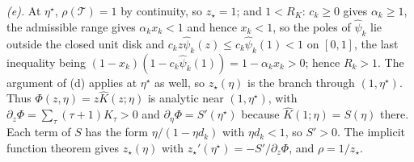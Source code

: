 \documentclass[11pt]{article}
\theoremstyle{remark}
\newcommand{\T}{\mathcal T}
\begin{document}
\emph{(e).} At $\eta^\star$, $\rho(\T)=1$ by continuity, so $z_\star=1$; and $1<R_K$: $c_k\ge0$ gives $\alpha_k\ge1$, the admissible range gives $\alpha_kx_k<1$ and hence $x_k<1$, so the poles of $\widehat\psi_k$ lie outside the closed unit disk and $c_kz\widehat\psi_k(z)\le c_k\widehat\psi_k(1)<1$ on $[0,1]$, the last inequality being $(1-x_k)(1-c_k\widehat\psi_k(1))=1-\alpha_kx_k>0$; hence $R_k>1$. The argument of (d) applies at $\eta^\star$ as well, so $z_\star(\eta)$ is the branch through $(1,\eta^\star)$. Thus $\Phi(z,\eta)=z\widehat K(z;\eta)$ is analytic near $(1,\eta^\star)$, with $\partial_z\Phi=\sum_\tau(\tau+1)K_\tau>0$ and $\partial_\eta\Phi=S'(\eta^\star)$ because $\widehat K(1;\eta)=S(\eta)$ there. Each term of $S$ has the form $\eta/(1-\eta d_k)$ with $\eta d_k<1$, so $S'>0$. The implicit function theorem gives $z_\star(\eta)$ with $z_\star'(\eta^\star)=-S'/\partial_z\Phi$, and $\rho=1/z_\star$.
\end{document}
